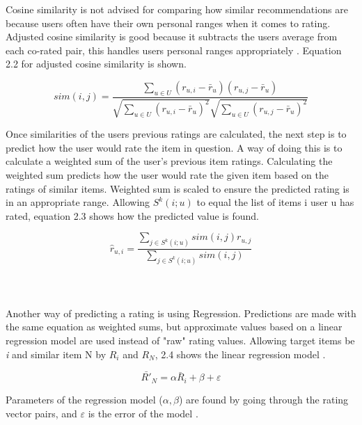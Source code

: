 Cosine similarity is not advised for comparing how similar recommendations are because users often have their own personal ranges when it comes to rating. Adjusted cosine similarity is good because it subtracts the users average from each co-rated pair, this handles users personal ranges appropriately \citep{sarwar_item-based_2001}. Equation 2.2 for adjusted cosine similarity is shown.

\begin{equation}
	sim(i , j) = \frac{ \sum_{ u \in U } ( r _{ u, i } - \bar{r} _{u} ) ( r _{ u, j} - \bar{r} _{u} ) } { \sqrt{\sum_{ u \in U } ( r _{ u, i } - \bar{r} _{u} )^2} \sqrt{\sum_{ u \in U } ( r _{ u, j } - \bar{r} _{u} )^2}}
\end{equation}

Once similarities of the users previous ratings are calculated, the next step is to predict how the user would rate the item in question. A way of doing this is to calculate a weighted sum of the user's previous item ratings. Calculating the weighted sum predicts how the user would rate the given item based on the ratings of similar items. Weighted sum is scaled to ensure the predicted rating is in an appropriate range\citep{sarwar_item-based_2001}. Allowing $ S^{k}(i;u)$ to equal the list of items i user u has rated, equation 2.3 shows how the predicted value is found.

\begin{equation}
	\hat{r} _{u,i} = \frac{ \sum _{ j \in S^{k}(i;u)} sim(i , j) r _{u, j}}{\sum _{j \in S^{k}(i;u)} sim(i , j)}
\end{equation}
\\
\\
\\
Another way of predicting a rating is using Regression. Predictions are made with the same equation as weighted sums, but approximate values based on a linear regression model are used instead of "raw" rating values. Allowing target items be \textit{i} and similar item N by $R_{i}$ and $R_{N}$, 2.4 shows the linear regression model \citep{sarwar_item-based_2001}.

\begin{equation}
	\bar{R'} _{N} = \alpha \bar{R}_{i} + \beta + \varepsilon
\end{equation}

Parameters of the regression model ($\alpha , \beta$) are found by going through the rating vector pairs, and $\varepsilon$ is the error of the model \citep{sarwar_item-based_2001}.

